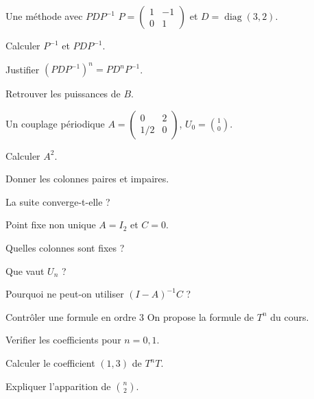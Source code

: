 \clearpage
{}
\begingroup\renewcommand{\otBesoinPlace}[1]{}\begin{minipage}{\linewidth}
\begin{exercice}[3]{Une méthode avec $PDP^{-1}$}
$P=\begin{pmatrix}1&-1\\0&1\end{pmatrix}$ et $D=\operatorname{diag}(3,2)$.
\begin{questions}
\item Calculer $P^{-1}$ et $PDP^{-1}$.
\item Justifier $(PDP^{-1})^n=PD^nP^{-1}$.
\item Retrouver les puissances de $B$.
\end{questions}
\end{exercice}
\begin{exercice}[3]{Un couplage périodique}
$A=\begin{pmatrix}0&2\\1/2&0\end{pmatrix}$, $U_0=\binom10$.
\begin{questions}
\item Calculer $A^2$.
\item Donner les colonnes paires et impaires.
\item La suite converge-t-elle ?
\end{questions}
\end{exercice}
\begin{exercice}[3]{Point fixe non unique}
$A=I_2$ et $C=0$.
\begin{questions}
\item Quelles colonnes sont fixes ?
\item Que vaut $U_n$ ?
\item Pourquoi ne peut-on utiliser $(I-A)^{-1}C$ ?
\end{questions}
\end{exercice}
\begin{exercice}[3]{Contrôler une formule en ordre $3$}
On propose la formule de $T^n$ du cours.
\begin{questions}
\item Verifier les coefficients pour $n=0,1$.
\item Calculer le coefficient $(1,3)$ de $T^nT$.
\item Expliquer l’apparition de $\binom n2$.
\end{questions}
\end{exercice}
\end{minipage}\endgroup
